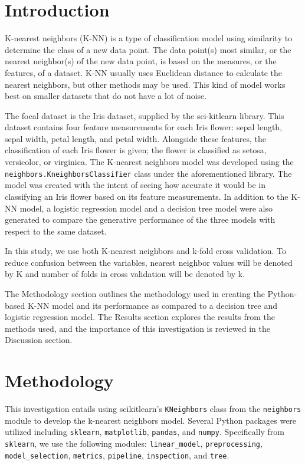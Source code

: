\documentclass[journal]{IEEEtran}
\begin{document}
\section{Introduction}
K-nearest neighbors (K-NN) is a type of classification model using similarity to determine the class of a new data point\cite{b1}. The data point(s) most similar, or the nearest neighbor(s) of the new data point, is based on the measures, or the features, of a dataset. K-NN usually uses Euclidean distance to calculate the nearest neighbors, but other methods may be used. This kind of model works best on smaller datasets that do not have a lot of noise. 

The focal dataset is the Iris dataset, supplied by the sci-kitlearn library. This dataset contains four feature measurements for each Iris flower: sepal length, sepal width, petal length, and petal width. Alongside these features, the classification of each Iris flower is given; the flower is classified as setosa, versicolor, or virginica. The K-nearest neighbors model was developed using the \lstinline{neighbors.KneighborsClassifier} class under the aforementioned library. The model was created with the intent of seeing how accurate it would be in classifying an Iris flower based on its feature measurements. In addition to the K-NN model, a logistic regression model and a decision tree model were also generated to compare the generative performance of the three models with respect to the same dataset. 

In this study, we use both K-nearest neighbors and k-fold cross validation. To reduce confusion between the variables, nearest neighbor values will be denoted by K and number of folds in cross validation will be denoted by k.

The Methodology section outlines the methodology used in creating the Python-based K-NN model and its performance as compared to a decision tree and logistic regression model. The Results section explores the results from the methods used, and the importance of this investigation is reviewed in the Discussion section.


\section{Methodology}
This investigation entails using scikitlearn's \lstinline{KNeighbors} class from the \lstinline{neighbors} module to develop the k-nearest neighbors model. Several Python packages were utilized including \lstinline{sklearn}, \lstinline{matplotlib}, \lstinline{pandas}, and \lstinline{numpy}. Specifically from \lstinline{sklearn}, we use the following modules: \lstinline{linear_model}, \lstinline{preprocessing}, \lstinline{model_selection}, \lstinline{metrics}, \lstinline{pipeline}, \lstinline{inspection}, and \lstinline{tree}. 
\end{document}
